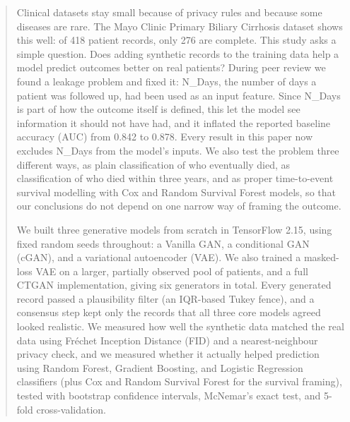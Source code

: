 \documentclass[journal]{IEEEtran}
\begin{document}
\begin{abstract}
Clinical datasets stay small because of privacy rules and because some diseases are rare. The Mayo Clinic Primary Biliary Cirrhosis dataset shows this well: of 418 patient records, only 276 are complete. This study asks a simple question. Does adding synthetic records to the training data help a model predict outcomes better on real patients? During peer review we found a leakage problem and fixed it: N\_Days, the number of days a patient was followed up, had been used as an input feature. Since N\_Days is part of how the outcome itself is defined, this let the model see information it should not have had, and it inflated the reported baseline accuracy (AUC) from 0.842 to 0.878. Every result in this paper now excludes N\_Days from the model's inputs. We also test the problem three different ways, as plain classification of who eventually died, as classification of who died within three years, and as proper time-to-event survival modelling with Cox and Random Survival Forest models, so that our conclusions do not depend on one narrow way of framing the outcome.

We built three generative models from scratch in TensorFlow 2.15, using fixed random seeds throughout: a Vanilla GAN, a conditional GAN (cGAN), and a variational autoencoder (VAE). We also trained a masked-loss VAE on a larger, partially observed pool of patients, and a full CTGAN implementation, giving six generators in total. Every generated record passed a plausibility filter (an IQR-based Tukey fence), and a consensus step kept only the records that all three core models agreed looked realistic. We measured how well the synthetic data matched the real data using Fr\'{e}chet Inception Distance (FID) and a nearest-neighbour privacy check, and we measured whether it actually helped prediction using Random Forest, Gradient Boosting, and Logistic Regression classifiers (plus Cox and Random Survival Forest for the survival framing), tested with bootstrap confidence intervals, McNemar's exact test, and 5-fold cross-validation.


\end{abstract}
\end{document}
